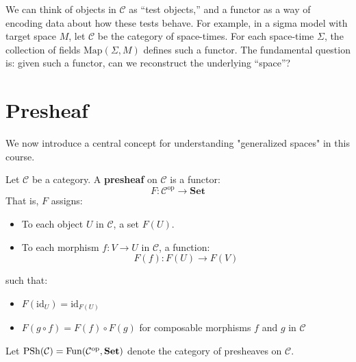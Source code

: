 \begin{remark}
We can think of objects in $\mathcal{C}$ as “test objects,” and a functor as a way of encoding data about how these tests behave. For example, in a sigma model with target space $M$, let $\mathcal{C}$ be the category of space-times. For each space-time $\Sigma$, the collection of fields $\mathrm{Map}(\Sigma, M)$ defines such a functor. The fundamental question is: given such a functor, can we reconstruct the underlying “space”?
\end{remark}

\section{Presheaf}

We now introduce a central concept for understanding "generalized spaces" in this course.

\begin{definition}[Presheaf]
Let $\mathcal{C}$ be a category. A \textbf{presheaf} on $\mathcal{C}$ is a functor:
\[
F: \mathcal{C}^{\mathrm{op}} \to \mathbf{Set}
\]
That is, $F$ assigns:
\begin{itemize}
    \item To each object $U$ in $\mathcal{C}$, a set $F(U)$.
    \item To each morphism $f: V \to U$ in $\mathcal{C}$, a function:
    \[
    F(f): F(U) \to F(V)
    \]
\end{itemize}
such that:
\begin{itemize}
    \item $F(\mathrm{id}_U) = \mathrm{id}_{F(U)}$
    \item $F(g \circ f) = F(f) \circ F(g)$ for composable morphisms $f$ and $g$ in $\mathcal{C}$
\end{itemize}
\end{definition}

Let $\mathrm{PSh}(\mathcal{C}) = \mathrm{Fun}(\mathcal{C}^{\mathrm{op}}, \mathbf{Set})$ denote the category of presheaves on $\mathcal{C}$.

